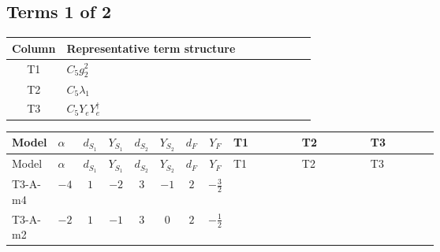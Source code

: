 \documentclass[8pt]{article}
\begin{document}
\begin{landscape}
\subsection*{Terms 1 of 2}
\begin{center}
\begin{tabular}{@{}c >{\raggedright\arraybackslash}p{0.82\linewidth}@{}}
\toprule
Column & Representative term structure \\
\midrule
T1 & \(\displaystyle C_{5} g_{2}^{2}\) \\
\midrule
T2 & \(\displaystyle C_{5} \lambda_1\) \\
\midrule
T3 & \(\displaystyle C_{5} Y_e Y_e^\dagger\) \\
\midrule
\bottomrule
\end{tabular}
\end{center}
\smallskip
\tiny
\begin{longtable}{@{}llcccccc >{\raggedright\arraybackslash}p{0.21\linewidth} >{\raggedright\arraybackslash}p{0.21\linewidth} >{\raggedright\arraybackslash}p{0.21\linewidth}@{}}
\toprule
Model & $\alpha$ & $d_{S_1}$ & $Y_{S_1}$ & $d_{S_2}$ & $Y_{S_2}$ & $d_F$ & $Y_F$ & T1 & T2 & T3 \\
\midrule
\endfirsthead
\toprule
Model & $\alpha$ & $d_{S_1}$ & $Y_{S_1}$ & $d_{S_2}$ & $Y_{S_2}$ & $d_F$ & $Y_F$ & T1 & T2 & T3 \\
\midrule
\endhead
T3-A-m4 & $-4$ & $1$ & $-2$ & $3$ & $-1$ & $2$ & $-\frac{3}{2}$ & \scriptsize\adjustbox{max width=\linewidth}{$\begin{gathered} - 3 C_{5} g_{2}^{2}\end{gathered}$} & \scriptsize\adjustbox{max width=\linewidth}{$\begin{gathered} 2 C_{5} \lambda_1\end{gathered}$} & \scriptsize\adjustbox{max width=\linewidth}{$\begin{gathered} - C_{5} Y_e Y_e^\dagger\end{gathered}$} \\
\midrule
T3-A-m2 & $-2$ & $1$ & $-1$ & $3$ & $0$ & $2$ & $-\frac{1}{2}$ & \scriptsize\adjustbox{max width=\linewidth}{$\begin{gathered} - 3 C_{5} g_{2}^{2}\end{gathered}$} & \scriptsize\adjustbox{max width=\linewidth}{$\begin{gathered} 2 C_{5} \lambda_1\end{gathered}$} & \scriptsize\adjustbox{max width=\linewidth}{$\begin{gathered} - C_{5} Y_e Y_e^\dagger\end{gathered}$} \\

\end{longtable}
\end{landscape}
\end{document}
